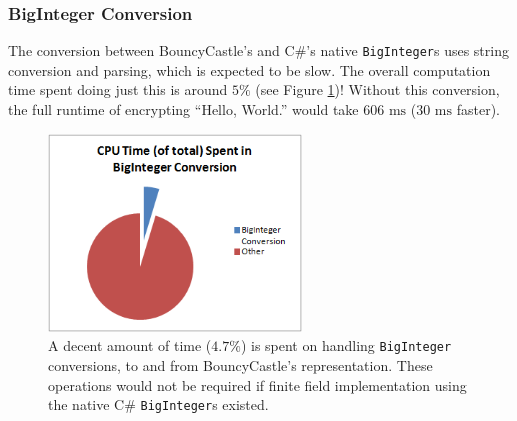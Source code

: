 \subsubsection{BigInteger Conversion}
\label{sec:performance_components_biginteger}

The conversion between BouncyCastle's and C\#'s native \texttt{BigInteger}s uses string conversion and parsing, which is expected to be slow.
The overall computation time spent doing just this is around \(5\%\) (see Figure \ref{fig:biginteger-performance})! Without this conversion,
the full runtime of encrypting ``Hello, World.'' would take \(606 \text{ ms}\) (\(30 \text{ ms}\) faster).

\begin{figure}[htb]
	\centering
	\includegraphics[width=0.6\textwidth]{performance/biginteger-conversion--relative-time}
	\caption{A decent amount of time (\(4.7\%\)) is spent on handling \texttt{BigInteger} conversions, to and from BouncyCastle's representation.
		These operations would not be required if finite field implementation using the native C\# \texttt{BigInteger}s existed.}
	\label{fig:biginteger-performance}
\end{figure}